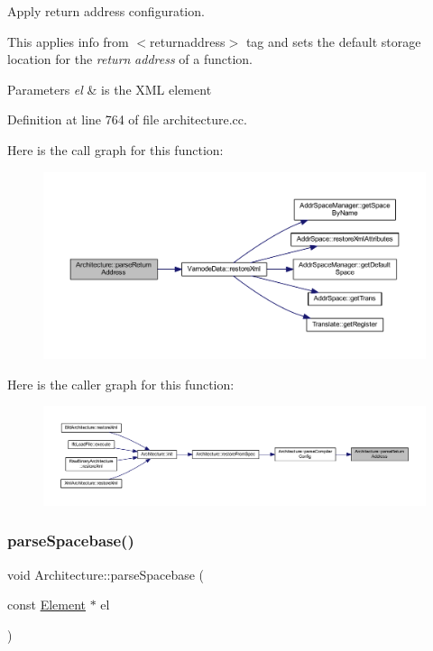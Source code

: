 Apply return address configuration. 

This applies info from $<$returnaddress$>$ tag and sets the default storage location for the {\itshape return} {\itshape address} of a function. 
\begin{DoxyParams}{Parameters}
{\em el} & is the X\+ML element \\
\hline
\end{DoxyParams}


Definition at line 764 of file architecture.\+cc.

Here is the call graph for this function\+:
\nopagebreak
\begin{figure}[H]
\begin{center}
\leavevmode
\includegraphics[width=350pt]{class_architecture_a24090e497ce6273f83bcb842be816ccb_cgraph}
\end{center}
\end{figure}
Here is the caller graph for this function\+:
\nopagebreak
\begin{figure}[H]
\begin{center}
\leavevmode
\includegraphics[width=350pt]{class_architecture_a24090e497ce6273f83bcb842be816ccb_icgraph}
\end{center}
\end{figure}
\mbox{\label{class_architecture_adf3b1aecaff0ca84c647ddbe6e25de5c}} 
\subsubsection{\texorpdfstring{parseSpacebase()}{parseSpacebase()}}
{\footnotesize\ttfamily void Architecture\+::parse\+Spacebase (\begin{DoxyParamCaption}\item[{const \mbox{\hyperlink{class_element}{Element}} $\ast$}]{el }\end{DoxyParamCaption})\hspace{0.3cm}{\ttfamily [protected]}}



